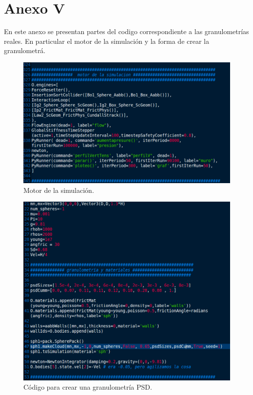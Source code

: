 \renewcommand{\appendixtocname}{Anexo V}
\appendix
\clearpage
 \addappheadtotoc %

\chapter*{ Anexo V} 
En este anexo se presentan partes del codigo correspondiente a las granulometr\'ias reales. En particular el motor de la simulaci\'on y la forma de crear la granulometr\'a.\\

\begin{figure}[htb]
\centering
\includegraphics[width=\textwidth]{Anexo5/motor.png}
\caption{Motor de la simulaci\'on.}
\label{fig:motor}
\end{figure}

\begin{figure}[htb]
\centering
\includegraphics[width=\textwidth]{Anexo5/gran.png}
\caption{C\'odigo para crear una granulometr\'ia PSD.}
\label{fig:PSD15}
\end{figure}
